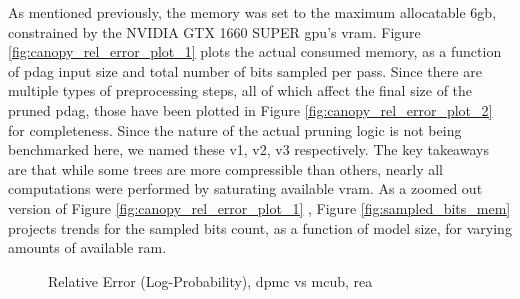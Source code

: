 As mentioned previously, the memory was set to the maximum allocatable 6\acrshort{gb}, constrained by the NVIDIA GTX 1660 SUPER \acrshort{gpu}'s \acrshort{vram}. Figure \ref{fig:canopy_rel_error_plot_1} plots the actual consumed memory, as a function of \acrshort{pdag} input size and total number of bits sampled per pass. Since there are multiple types of preprocessing steps, all of which affect the final size of the pruned \acrshort{pdag}, those have been plotted in Figure \ref{fig:canopy_rel_error_plot_2} for completeness. Since the nature of the actual pruning logic is not being benchmarked here, we named these v1, v2, v3 respectively. The key takeaways are that while some trees are more compressible than others, nearly all computations were performed by saturating available \acrshort{vram}. As a zoomed out version of Figure \ref{fig:canopy_rel_error_plot_1} , Figure \ref{fig:sampled_bits_mem} projects trends for the sampled bits count, as a function of model size, for varying amounts of available \acrshort{ram}.
\begin{landscape}
\begin{figure}[p]
    \centering
    
    \caption{Relative Error (Log-Probability), \acrfull{dpmc} vs \acrfull{mcub}, \acrfull{rea}}
    \label{fig:canopy_rel_error_plot}
\end{figure}
\end{landscape}

